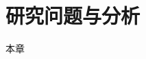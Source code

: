 \chapter{研究问题与分析}\label{problem}
本章
\section{}
\section{}
\section{}
\section{}
\section{}
\section{}